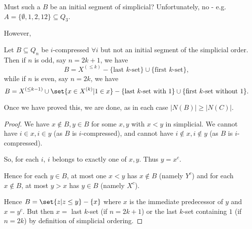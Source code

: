 \documentclass{article}
\let\subset\subseteq
\begin{document}
Must such a $B$ be an initial segment of simplicial?
Unfortunately, no - e.g.\ $A = \{\emptyset,1,2,12\} \subset Q_3$.

However,
\begin{nlemma}\label{lem:2.2}
  Let $B \subset Q_n$ be $i$-compressed $\forall i$ but not an initial segment of the simplicial order.
  Then if $n$ is odd, say $n = 2k+1$, we have
  \begin{equation*}
    B = X^{(\leq k)} - \{\text{last $k$-set}\} \cup \{\text{first $k$-set}\}, %
  \end{equation*}
  while if $n$ is even, say $n = 2k$, we have
  \begin{equation*}
    B = X^{(\leq k-1)} \cup \set{x \in X^{(k)} | 1 \in x} - \{\text{last $k$-set with 1}\} \cup \{\text{first $k$-set without $1$}\}. %
  \end{equation*}
\end{nlemma}
Once we have proved this, we are done, as in each case $|N(B)| \geq |N(C)|$.
\begin{proof}
  We have $x \notin B, y \in B$ for some $x,y$ with $x<y$ in simplicial.
  We cannot have $i \in x, i \in y$ (as $B$ is $i$-compressed), and cannot have $i \notin x, i \notin y$ (as $B$ is $i$-compressed).

  So, for each $i$, $i$ belongs to exactly one of $x,y$.
  Thus $y = x^c$.

  Hence for each $y \in B$, at most one $x < y$ has $x \notin B$ (namely $Y^c$) and for each $x \notin B$, at most $y > x$ has $y \in B$ (namely $X^c$).

  Hence $B = \set{z | z \leq y} - \{x\}$ where $x$ is the immediate predecessor of $y$ and $x = y^c$.
  But then $x=$ last $k$-set (if $n=2k+1$) or the last $k$-set containing $1$ (if $n = 2k$)
  by definition of simplicial ordering.
\end{proof}
\end{document}
